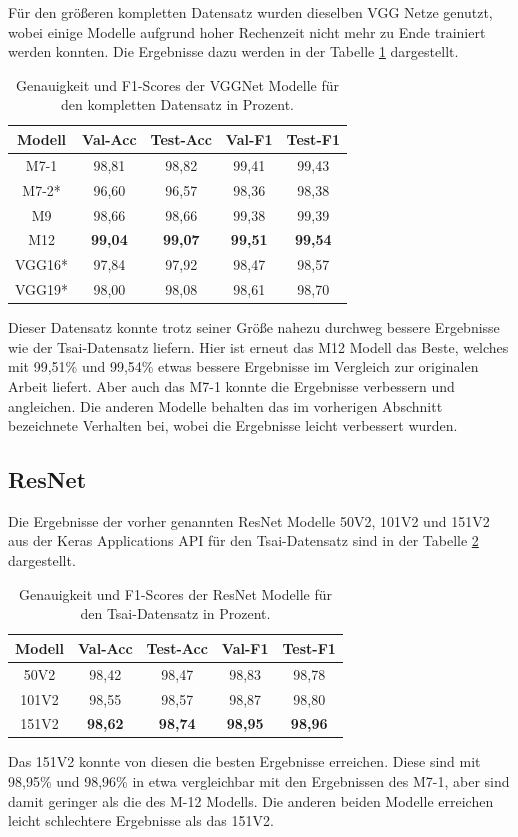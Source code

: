 \documentclass[twoside,a4paper]{IEEEtran}
\begin{document}
Für den größeren kompletten Datensatz wurden dieselben VGG Netze genutzt, wobei einige Modelle aufgrund hoher Rechenzeit nicht mehr zu Ende trainiert werden konnten. Die Ergebnisse dazu werden in der Tabelle \ref{vgg_ergebnis_full} dargestellt.
\begin{table}[!htb]
	\caption{Genauigkeit und F1-Scores der VGGNet Modelle für den kompletten Datensatz in Prozent.}
	\label{vgg_ergebnis_full}
	\centering
	\begin{tabular}{|c|c|c|c|c|}
		\hline
		Modell & Val-Acc & Test-Acc & Val-F1 & Test-F1\\
		\hline 
		\hline 
		M7-1 & 98,81 & 98,82 & 99,41 & 99,43\\
		\hline
		M7-2* & 96,60 & 96,57 & 98,36 & 98,38\\
		\hline
		M9 & 98,66 & 98,66 & 99,38 & 99,39\\
		\hline 
		M12 & \textbf{99,04} & \textbf{99,07} & \textbf{99,51} & \textbf{99,54}\\
		\hline 
		VGG16* & 97,84 & 97,92 & 98,47 & 98,57\\
		\hline 
		VGG19* & 98,00 & 98,08 & 98,61 & 98,70\\
		\hline 
	\end{tabular}
\end{table}

Dieser Datensatz konnte trotz seiner Größe nahezu durchweg bessere Ergebnisse wie der Tsai-Datensatz liefern. Hier ist erneut das M12 Modell das Beste, welches mit 99,51\% und 99,54\% etwas bessere Ergebnisse im Vergleich zur originalen Arbeit liefert. Aber auch das M7-1 konnte die Ergebnisse verbessern und angleichen. Die anderen Modelle behalten das im vorherigen Abschnitt bezeichnete Verhalten bei, wobei die Ergebnisse leicht verbessert wurden.
\subsection{ResNet}

Die Ergebnisse der vorher genannten ResNet Modelle 50V2, 101V2 und 151V2 aus der Keras Applications API für den Tsai-Datensatz sind in der Tabelle \ref{resnet_ergebnis_tsai} dargestellt.
\begin{table}[!htb]
	\caption{Genauigkeit und F1-Scores der ResNet Modelle für den Tsai-Datensatz in Prozent.}
	\label{resnet_ergebnis_tsai}
	\centering
	\begin{tabular}{|c|c|c|c|c|}
		\hline
		Modell & Val-Acc & Test-Acc & Val-F1 & Test-F1\\
		\hline
		\hline
	 	50V2 & 98,42 & 98,47 & 98,83 & 98,78\\
		\hline
		101V2 & 98,55 & 98,57 & 98,87 & 98,80\\
		\hline
		151V2 & \textbf{98,62} & \textbf{98,74} & \textbf{98,95} & \textbf{98,96}\\
		\hline 
	\end{tabular}
\end{table} 
Das 151V2 konnte von diesen die besten Ergebnisse erreichen. Diese sind mit 98,95\% und 98,96\% in etwa vergleichbar mit den Ergebnissen des M7-1, aber sind damit geringer als die des M-12 Modells. Die anderen beiden Modelle erreichen leicht schlechtere Ergebnisse als das 151V2. 
\end{document}
